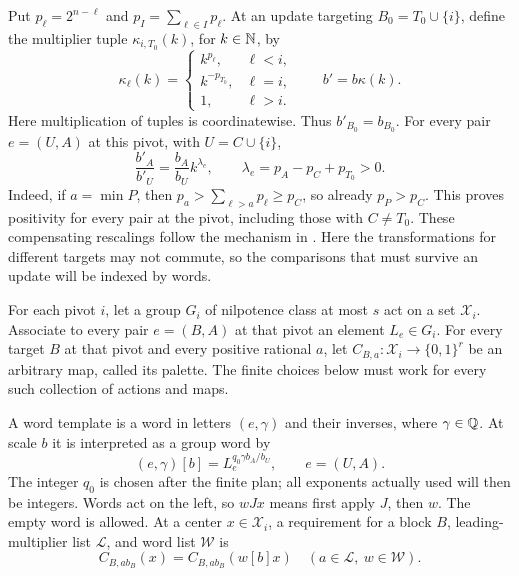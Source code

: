 Put $p_\ell=2^{n-\ell}$ and $p_I=\sum_{\ell\in I}p_\ell$.
At an update targeting $B_0=T_0\cup\{i\}$, define the multiplier tuple
$\kappa_{i,T_0}(k)$, for $k\in\mathbb N$, by
\begin{equation}\label{eq:alignment-scale-update}
 \kappa_\ell(k)=
 \begin{cases}
 k^{p_\ell},&\ell<i,\\
 k^{-p_{T_0}},&\ell=i,\\
 1,&\ell>i.
 \end{cases}
 \qquad b'=b\kappa(k).
\end{equation}
Here multiplication of tuples is coordinatewise.  Thus $b'_{B_0}=b_{B_0}$.
For every pair $e=(U,A)$ at this pivot, with $U=C\cup\{i\}$,
\begin{equation}\label{eq:alignment-positive-exponents}
 \frac{b'_A}{b'_U}=\frac{b_A}{b_U}k^{\lambda_e},
 \qquad \lambda_e=p_A-p_C+p_{T_0}>0.
\end{equation}
Indeed, if $a=\min P$, then
$p_a>\sum_{\ell>a}p_\ell\ge p_C$, so already $p_P>p_C$.
This proves positivity for every pair at the pivot, including those with
$C\ne T_0$.
These compensating rescalings follow the mechanism in
\cite[proof of Proposition~4.1]{Alweiss}.  Here the transformations
for different targets may not commute, so the comparisons that must
survive an update will be indexed by words.

For each pivot $i$, let a group $G_i$ of nilpotence class at most $s$
act on a set $\mathcal X_i$.  Associate to every pair $e=(B,A)$ at
that pivot an element $L_e\in G_i$.  For every target $B$ at that
pivot and every positive rational $a$, let
$C_{B,a}:\mathcal X_i\to\{0,1\}^r$ be an arbitrary map, called its
palette.  The finite choices below must work for every such collection
of actions and maps.

A word template is a word in letters $(e,\gamma)$ and their inverses,
where $\gamma\in\mathbb Q$.  At scale $b$ it is interpreted as a group word by
\begin{equation}\label{eq:alignment-letter}
 (e,\gamma)[b]=L_e^{q_0\gamma b_A/b_U},\qquad e=(U,A).
\end{equation}
The integer $q_0$ is chosen after the finite plan; all exponents actually
used will then be integers.  Words act on the left, so $wJx$ means first
apply $J$, then $w$.  The empty word is allowed.  At a center
$x\in\mathcal X_i$, a requirement for a block $B$,
leading-multiplier list $\mathcal L$, and word list $\mathcal W$ is
\begin{equation}\label{eq:alignment-word-requirement}
 C_{B,a b_B}(x)=C_{B,a b_B}(w[b]x)
 \quad(a\in\mathcal L,\ w\in\mathcal W).
\end{equation}

